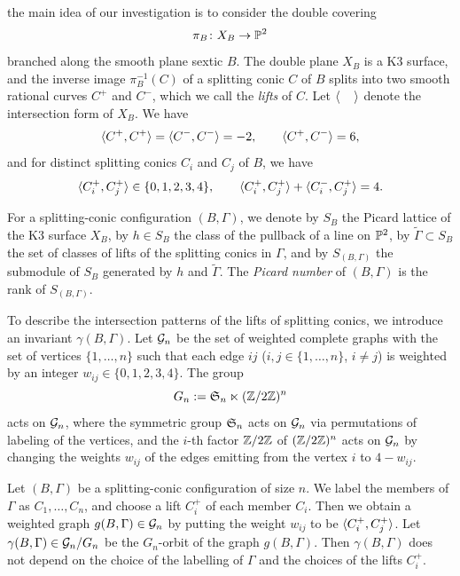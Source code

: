 \documentclass{amsart} %
\begin{document}
the main idea of our investigation is to consider
the double covering
\[
\pi_B \colon X_B \to \mathord{\mathbb{P}}^2
\]
branched along the smooth plane sextic $B$.
The double plane $X_B$ is a K3 surface,
and the inverse image $\pi_B^{-1}(C)$ of a splitting conic  $C$ of $B$
splits into two smooth rational curves $C^+$ and $C^-$,
which we call the \emph{lifts} of $C$.
Let $\langle \phantom{i, i} \rangle$ denote 
the intersection form of $X_B$.
We have 
\[
\langle C^+, C^+ \rangle=\langle C^-, C^- \rangle=-2, 
\qquad
\langle C^+, C^- \rangle=6, 
\]
and 
for  distinct splitting conics $C_i$ and $C_j$ of $B$,
we have
\[
\langle C_i^+, C_j^+ \rangle\in \{0,1,2,3,4\},
\qquad
\langle C_i^+, C_j^+ \rangle+\langle C_i^-, C_j^+ \rangle=4.
\]
%
% 
\begin{definition}\label{def:rho}
For a splitting-conic configuration $(B,\Gamma)$,
we denote by $S_B$ the Picard lattice of the K3 surface $X_B$,
by $h \in S_B$ the class of the pullback of a line on $\mathord{\mathbb{P}}^2$,
by $\widetilde{\Gamma} \subset S_B$
the set of classes of lifts of the splitting conics in $\Gamma$,
and by $S_{(B,\Gamma)}$ the submodule of $S_B$ generated by
$h$ and $\widetilde{\Gamma}$.
The \emph{Picard number} of $(B,\Gamma)$
is the rank of $S_{(B,\Gamma)}$.
\end{definition}
%
To describe the intersection patterns of the lifts
of splitting conics,
we introduce an invariant $\gamma(B,\Gamma)$.
Let $\mathord{\mathcal{G}}_n$ be the set of weighted complete graphs
with the set of vertices $\{1,\ldots,n\}$
such that  each edge $ij$ ($i, j\in \{1,\ldots,n\}$, $i\ne j$)
is weighted by an integer
$w_{ij} \in \{0,1,2,3,4\}$.
The group
\[
G_n := \mathord{\mathfrak{S}}_n \ltimes (\mathord{\mathbb{Z}}/2\mathord{\mathbb{Z}})^n
\]
acts on $\mathord{\mathcal{G}}_n$,
where the symmetric group $\mathord{\mathfrak{S}}_n$ acts on $\mathord{\mathcal{G}}_n$
via  permutations of labeling of the vertices,
and the $i$-th factor $\mathord{\mathbb{Z}}/2\mathord{\mathbb{Z}}$ of $(\mathord{\mathbb{Z}}/2\mathord{\mathbb{Z}})^n$
acts on $\mathord{\mathcal{G}}_n$ by changing the weights $w_{ij}$
of the edges emitting from the vertex $i$ to $4-w_{ij}$.
%
\begin{definition}
Let $(B,\Gamma)$ be a splitting-conic configuration of size $n$.
We label the members of $\Gamma$ as
$C_1,\ldots,C_n$, and choose a lift $C_i^+$
of each member $C_i$.
Then we obtain a weighted graph
$g(B,\Gamma) \in \mathord{\mathcal{G}}_n$
by putting the weight $w_{ij}$ to be $\langle C_i^+, C_j^+ \rangle$.
Let
$\gamma(B,\Gamma) \in \mathord{\mathcal{G}}_n/G_n$
be the $G_n$-orbit of the graph $g(B,\Gamma)$.
Then $\gamma(B,\Gamma)$
does not depend on the choice of the labelling
of  $\Gamma$ and the choices
of the lifts $C_i^+$.
\end{definition}
%
%
\end{document}
